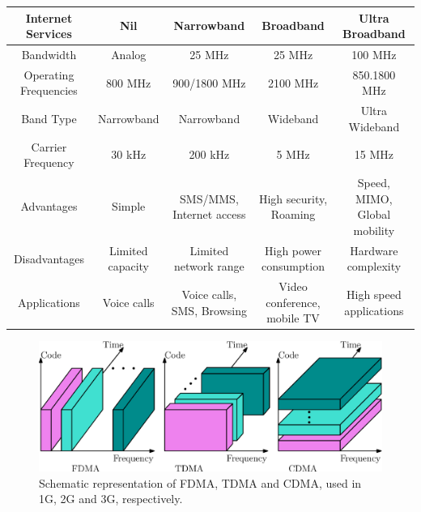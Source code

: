 \begin{table}[ht]
\begin{center}
{\begin{tabular}{|c|c|c|c|c|}
Internet Services       & Nil               & Narrowband                         & Broadband                            & Ultra Broadband                                      \\ \hline
Bandwidth               & Analog            & 25 MHz                             & 25 MHz                               & 100 MHz                                              \\ \hline
Operating Frequencies   & 800 MHz           & 900/1800 MHz                       & 2100 MHz                             & 850.1800 MHz                                         \\ \hline
Band Type               & Narrowband        & Narrowband                         & Wideband                             & Ultra Wideband                                       \\ \hline
Carrier Frequency       & 30 kHz            & 200 kHz                            & 5 MHz                                & 15 MHz                                               \\ \hline
Advantages              & Simple            & SMS/MMS, Internet access           & High security, Roaming & Speed, MIMO, Global mobility                         \\ \hline
Disadvantages           & Limited capacity  & Limited network range              & High power consumption               & Hardware complexity                                  \\ \hline
Applications            & Voice calls       & Voice calls, SMS, Browsing & Video conference, mobile TV     & High speed applications \\ \hline
\end{tabular}}\relax
\end{center}
\end{table}

\setcounter{figure}{0}
\begin{figure}
 \begin{center}
  \includegraphics[scale=0.77]{src/Figures/chap5/MultipleAccess.eps}
  \caption{Schematic representation of FDMA, TDMA and CDMA, used in 1G, 2G and 3G, respectively.} \label{Fig_MA}
 \end{center}
\end{figure}


